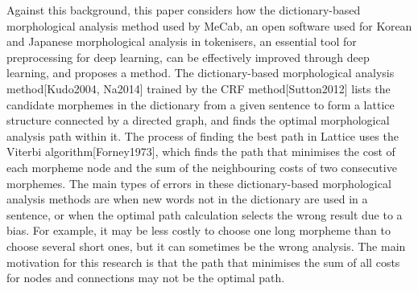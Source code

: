 \documentclass[AMS,STIX2COL]{WileyNJD-v2}
\begin{document}

    Against this background, this paper considers how the dictionary-based morphological analysis method used by MeCab, an open software used for Korean and Japanese morphological analysis in tokenisers, an essential tool for preprocessing for deep learning, can be effectively improved through deep learning, and proposes a method.
    The dictionary-based morphological analysis method[Kudo2004, Na2014] trained by the CRF method[Sutton2012] lists the candidate morphemes in the dictionary from a given sentence to form a lattice structure connected by a directed graph, and finds the optimal morphological analysis path within it.
    The process of finding the best path in Lattice uses the Viterbi algorithm[Forney1973], which finds the path that minimises the cost of each morpheme node and the sum of the neighbouring costs of two consecutive morphemes.
    The main types of errors in these dictionary-based morphological analysis methods are when new words not in the dictionary are used in a sentence, or when the optimal path calculation selects the wrong result due to a bias.
    For example, it may be less costly to choose one long morpheme than to choose several short ones, but it can sometimes be the wrong analysis.
    The main motivation for this research is that the path that minimises the sum of all costs for nodes and connections may not be the optimal path.
\end{document}
